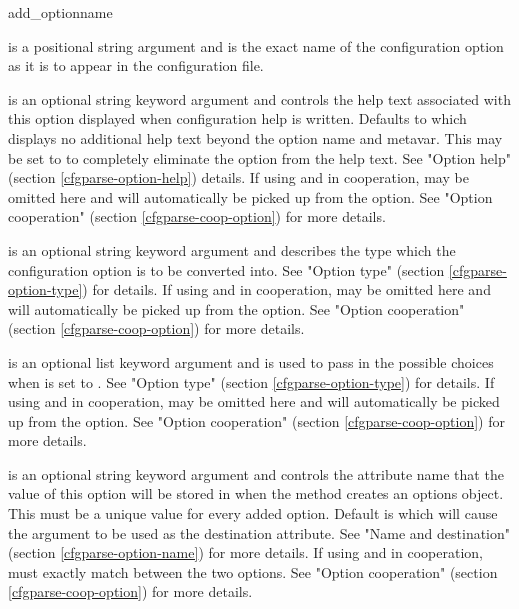 \documentclass{howto}
\begin{document}
  \begin{funcdesc}{add_option}{name
      }

     is a positional string argument and is the exact name of the 
        configuration option as it is to appear in the configuration file.
        
     is an optional string keyword argument and controls the help
        text associated with this option displayed when configuration help 
        is written.  Defaults to  which displays no additional
        help text beyond the option name and metavar.  This may be set to
         to completely eliminate the option 
        from the help text.  See "Option help" (section 
        \ref{cfgparse-option-help}) details.
        If using  and  in cooperation, 
         may be omitted here and will automatically be picked 
        up from the  option.  See "Option cooperation" 
        (section \ref{cfgparse-coop-option}) for more details.

     is an optional string keyword argument and describes the type
        which the configuration option is to be converted into.  See 
        "Option type" (section \ref{cfgparse-option-type}) for details.
        If using  and  in cooperation, 
         may be omitted here and will automatically be picked 
        up from the  option.  See "Option cooperation" 
        (section \ref{cfgparse-coop-option}) for more details.
        
     is an optional list keyword argument and is used to pass in the
        possible choices when  is set to .  See 
        "Option type" (section \ref{cfgparse-option-type}) for details.
        If using  and  in cooperation, 
         may be omitted here and will automatically be picked 
        up from the  option.  See "Option cooperation" 
        (section \ref{cfgparse-coop-option}) for more details.
                    
     is an optional string keyword argument and controls the 
        attribute name that the value of this option will be stored in
        when the  method creates an options object.  This
        must be a unique value for every added option.  Default is 
        which will cause the  argument to be used as the
        destination attribute.  See "Name and destination" (section 
        \ref{cfgparse-option-name}) for more details.
        If using  and  in cooperation, 
         must exactly match between the two options.  
        See "Option cooperation" (section \ref{cfgparse-coop-option}) for more details.


\end{funcdesc}
\end{document}
